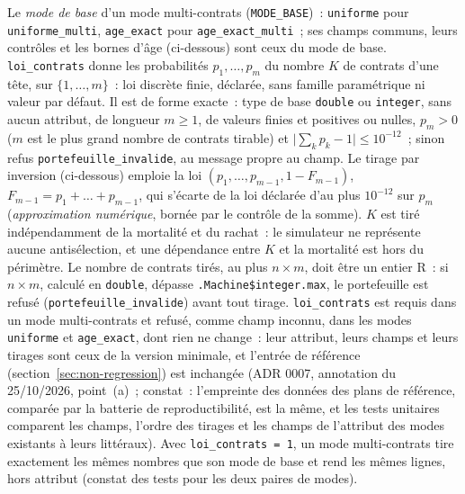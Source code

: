 \documentclass[a4paper,11pt]{article}
\newcommand{\code}[1]{\texttt{\small #1}}
\begin{document}
\noindent
Le \emph{mode de base} d'un mode multi-contrats (\code{MODE\_BASE})~:
\code{uniforme} pour \code{uniforme\_multi}, \code{age\_exact} pour
\code{age\_exact\_multi}~; ses champs communs, leurs contrôles et les bornes
d'âge (ci-dessous) sont ceux du mode de base. \code{loi\_contrats} donne les
probabilités $p_1, \dots, p_m$ du nombre $K$ de contrats d'une tête, sur
$\{1, \dots, m\}$~: loi discrète finie, déclarée, sans famille
paramétrique ni valeur par défaut. Il est de forme exacte~: type de base
\code{double} ou \code{integer}, sans aucun attribut, de longueur
$m \ge 1$, de valeurs finies et positives ou nulles, $p_m > 0$ ($m$ est le
plus grand nombre de contrats tirable) et
$\bigl|\sum_k p_k - 1\bigr| \le 10^{-12}$~; sinon refus
\code{portefeuille\_invalide}, au message propre au champ. Le tirage par
inversion (ci-dessous) emploie la loi
$(p_1, \dots, p_{m-1}, 1 - F_{m-1})$, $F_{m-1} = p_1 + \dots + p_{m-1}$,
qui s'écarte de la loi déclarée d'au plus $10^{-12}$ sur $p_m$
(\emph{approximation numérique}, bornée par le contrôle de la somme). $K$
est tiré indépendamment de la mortalité et du rachat~: le simulateur ne
représente aucune antisélection, et une dépendance entre $K$ et la mortalité
est hors du périmètre. Le nombre de contrats tirés, au plus $n \times m$,
doit être un entier R~: si $n \times m$, calculé en \code{double}, dépasse
\code{.Machine\$integer.max}, le portefeuille est refusé
(\code{portefeuille\_invalide}) avant tout tirage. \code{loi\_contrats} est
requis dans un mode multi-contrats et refusé, comme champ inconnu, dans les
modes \code{uniforme} et \code{age\_exact}, dont rien ne change~: leur
attribut, leurs champs et leurs tirages sont ceux de la version minimale,
et l'entrée de référence (section~\ref{sec:non-regression}) est inchangée
(ADR 0007, annotation du 25/10/2026, point~(a)~; constat~: l'empreinte des
données des plans de référence, comparée par la batterie de
reproductibilité, est la même, et les tests unitaires comparent les champs,
l'ordre des tirages et les champs de l'attribut des modes existants à leurs
littéraux). Avec
\code{loi\_contrats = 1}, un mode multi-contrats tire exactement les mêmes
nombres que son mode de base et rend les mêmes lignes, hors attribut
(constat des tests pour les deux paires de modes).
\end{document}
